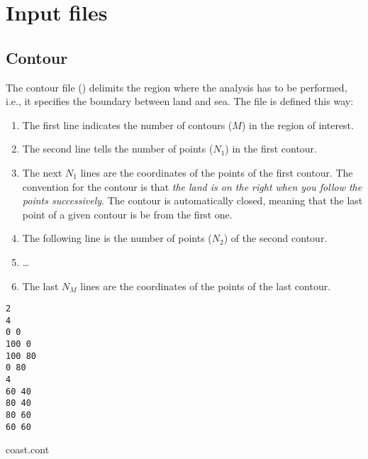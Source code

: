 \section{Input files\label{sec:diva2Dinput}}

\subsection{Contour\label{contourdiva}}

The contour file () delimits the region where the analysis has to be performed, i.e., it specifies the boundary between land and sea. The file is defined this way:
\begin{enumerate}
\item The first line indicates the number of contours ($M$) in the region of interest.
\item The second line tells the number of points ($N_{1}$) in the first contour.
\item The next $N_1$ lines are the coordinates of the points of the first contour. The convention for the contour is that \textit{the land is on the right when you follow the points successively}. The contour is automatically closed, meaning that the last point of a given contour is be from the first one. 
\item The following line is the number of points ($N_{2}$) of the second contour.
\item \ldots
\item The last $N_M$ lines are the coordinates of the points of the last contour.
\end{enumerate}

\begin{exfile}[htpb]
\begin{footnotesize}
\texttt{2\\
4\\
0 0\\
100 0\\
100 80\\
0 80\\
4\\
60 40\\
80 40\\
80 60\\
60 60} 
\end{footnotesize}
\caption{coast.cont\label{ex:coast.dat}}
\end{exfile}


